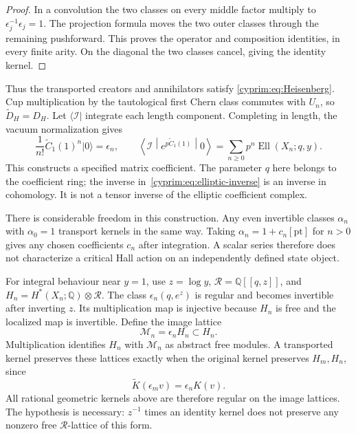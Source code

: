 \begin{proof}
In a convolution the two classes on every middle factor
multiply to $\epsilon_j^{-1}\epsilon_j=1$. The projection
formula moves the two outer classes through the remaining
pushforward. This proves the operator and composition
identities, in every finite arity. On the diagonal the two
classes cancel, giving the identity kernel.
\end{proof}

Thus the transported creators and annihilators satisfy
\eqref{cyprim:eq:Heisenberg}. Cup multiplication by the
tautological first Chern class commutes with $U_n$, so
$\widetilde D_H=D_H$. Let $\langle\mathcal I|$ integrate
each length component. Completing in length, the vacuum
normalization gives
\begin{equation}\label{cyprim:eq:elliptic-matrix}
 \frac1{n!}\widetilde C_1(1)^n|0\rangle=\epsilon_n,
 \qquad
 \left\langle\mathcal I\middle|
 e^{p\widetilde C_1(1)}\middle|0\right\rangle
   =\sum_{n\ge0}p^n\operatorname{Ell}(X_n;q,y).
\end{equation}
This constructs a specified matrix coefficient. The
parameter $q$ here belongs to the coefficient ring; the
inverse in~\eqref{cyprim:eq:elliptic-inverse} is an inverse
in cohomology. It is not a tensor inverse of the elliptic
coefficient complex.

There is considerable freedom in this construction.
Any even invertible classes $\alpha_n$ with $\alpha_0=1$
transport kernels in the same way. Taking
$\alpha_n=1+c_n[\mathrm{pt}]$ for $n>0$ gives any chosen
coefficients $c_n$ after integration. A scalar series
therefore does not characterize a critical Hall action
on an independently defined state object.

For integral behaviour near $y=1$, use $z=\log y$,
$\mathcal R=\mathbb Q[[q,z]]$, and
$H_n=H^*(X_n;\mathbb Q)\otimes\mathcal R$.
The class $\epsilon_n(q,e^z)$ is regular and becomes
invertible after inverting $z$. Its multiplication map
is injective because $H_n$ is free and the localized map
is invertible. Define the image lattice
\[
 \mathcal M_n=\epsilon_n H_n\subset H_n.
\]
Multiplication identifies $H_n$ with $\mathcal M_n$
as abstract free modules. A transported kernel preserves
these lattices exactly when the original kernel preserves
$H_m,H_n$, since
\begin{equation}\label{cyprim:eq:lattice-action}
 \widetilde K(\epsilon_m v)=\epsilon_n K(v).
\end{equation}
All rational geometric kernels above are therefore regular
on the image lattices. The hypothesis is necessary:
$z^{-1}$ times an identity kernel does not preserve any
nonzero free $\mathcal R$-lattice of this form.

